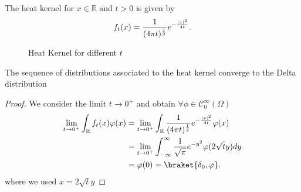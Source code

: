 \begin{example}
 The heat kernel for $x \in  \mathbb{R}$ and $t>0$ is given by
 \begin{align*}
   f_t(x) = \frac{1}{(4\pi t)^{\frac{1}{2}}} e^{-\frac{\lvert x\rvert^2}{4t}} 
 .\end{align*}
\begin{figure}[H]
  \begin{center}
  \end{center}
  \caption{Heat Kernel for different $t$}
\end{figure}
\end{example}
\begin{lemma}
  The sequence of distributions associated to the heat kernel converge to the Delta distribution 
\end{lemma}
\begin{proof}
 We consider the limit $t\to 0^+$  and obtain $\forall \phi  \in  \mathcal{C}_0^{\infty}(\Omega ) $
 \begin{align*}
   \lim_{t \to 0^+} \int_\mathbb{R} f_t(x) \phi(x) &= \lim_{t \to  0^+} \int_\mathbb{R} \frac{1}{(4\pi t)^{\frac{1}{2}} } e^{-\frac{\abs{x}^2}{4t}} \phi(x)\\
                                                   &= \lim_{t \to 0^+} \int_{-\infty}^{\infty} \frac{1}{\sqrt{\pi} }  e^{-y^2}  \phi(2 \sqrt{t}y) dy \\
                                                   &= \phi(0) = \braket{\delta_0,\phi }
 .\end{align*}
 where we used $x = 2\sqrt{t}y $ 
\end{proof}
